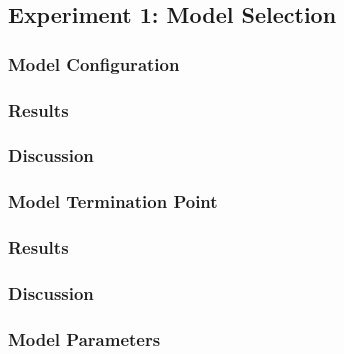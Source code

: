 \documentclass[runningheads]{llncs}
\begin{document}
% 

% 



% 
% 
% 
\subsection{Experiment 1: Model Selection}
\label{sec:experiment1}
\subsubsection{Model Configuration}
\subsubsection{Results}

\subsubsection{Discussion}

\subsubsection{Model Termination Point}
\subsubsection{Results}

\subsubsection{Discussion}

\subsubsection{Model Parameters}
\end{document}
